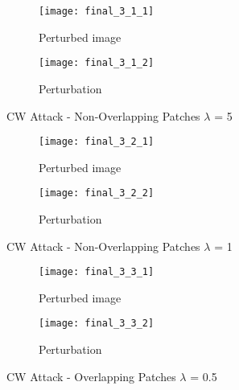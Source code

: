 \documentclass[11pt]{article}
\begin{document}
\begin{figure}[H]
\begin{subfigure}{.5\textwidth}
  \centering
  \texttt{[image: final\_3\_1\_1]}
  \caption{Perturbed image}
  \label{fig:}
\end{subfigure}
\begin{subfigure}{.5\textwidth}
  \centering
  \texttt{[image: final\_3\_1\_2]}
  \caption{Perturbation}
  \label{fig:}
\end{subfigure}

\caption{CW Attack - Non-Overlapping Patches $\lambda$ = 5}
\label{fig:}
\end{figure}

\begin{figure}[H]
\begin{subfigure}{.5\textwidth}
  \centering
  \texttt{[image: final\_3\_2\_1]}
  \caption{Perturbed image}
  \label{fig:}
\end{subfigure}
\begin{subfigure}{.5\textwidth}
  \centering
  \texttt{[image: final\_3\_2\_2]}
  \caption{Perturbation}
  \label{fig:}
\end{subfigure}

\caption{CW Attack - Non-Overlapping Patches $\lambda$ = 1}
\label{fig:}
\end{figure}

\begin{figure}[H]
\begin{subfigure}{.5\textwidth}
  \centering
  \texttt{[image: final\_3\_3\_1]}
  \caption{Perturbed image}
  \label{fig:}
\end{subfigure}
\begin{subfigure}{.5\textwidth}
  \centering
  \texttt{[image: final\_3\_3\_2]}
  \caption{Perturbation}
  \label{fig:}
\end{subfigure}

\caption{CW Attack - Overlapping Patches $\lambda$ = 0.5}
\label{fig:}
\end{figure}
\end{document}
